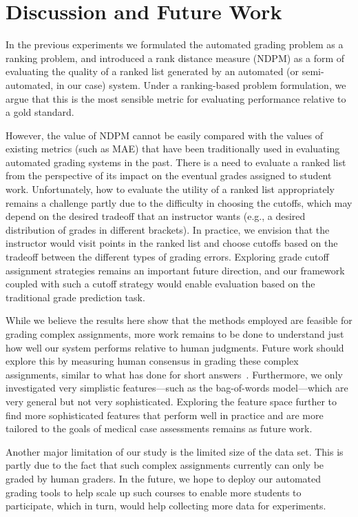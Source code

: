 \section{Discussion and Future Work}

In the previous experiments we formulated the automated grading problem as
a ranking problem, and introduced a rank distance measure (NDPM) as a form
of evaluating the quality of a ranked list generated by an automated (or
semi-automated, in our case) system. Under a ranking-based problem
formulation, we argue that this is the most sensible metric for evaluating
performance relative to a gold standard.

However, the value of NDPM cannot be easily compared with the values of
existing metrics (such as MAE) that have been traditionally used in
evaluating automated grading systems in the past. There is a need to
evaluate a ranked list from the perspective of its impact on the eventual
grades assigned to student work. Unfortunately, how to evaluate the utility
of a ranked list appropriately remains a challenge partly due to the
difficulty in choosing the cutoffs, which may depend on the desired
tradeoff that an instructor wants (e.g., a desired distribution of grades
in different brackets). In practice, we envision that the instructor would
visit points in the ranked list and choose cutoffs based on the tradeoff
between the different types of grading errors. Exploring grade cutoff
assignment strategies remains an important future direction, and our
framework coupled with such a cutoff strategy would enable evaluation based
on the traditional grade prediction task.

While we believe the results here show that the methods employed are
feasible for grading complex assignments, more work remains to be done to
understand just how well our system performs relative to human judgments.
Future work should explore this by measuring human consensus in grading
these complex assignments, similar to what has done for short
answers~\cite{Mohler:2009:EACL}. Furthermore, we only investigated very
simplistic features---such as the bag-of-words model---which are very
general but not very sophisticated. Exploring the feature space further to
find more sophisticated features that perform well in practice and are more
tailored to the goals of medical case assessments remains as future work.

Another major limitation of our study is the limited size of the data set.
This is partly due to the fact that such complex assignments currently can
only be graded by human graders. In the future, we hope to deploy our
automated grading tools to help scale up such courses to enable more
students to participate, which in turn, would help collecting more data for
experiments.


